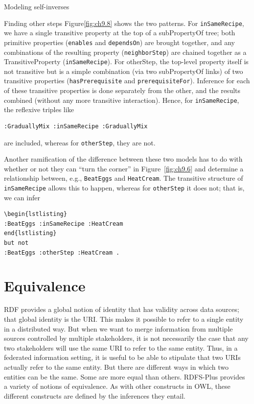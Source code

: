 \begin{challenge}{Modeling self-inverses}
\begin{challenge}{Finding other steps}
Figure\ref{fig:ch9.8} shows the two patterns. For \texttt{inSameRecipe}, we have a single
transitive property at the top of a subPropertyOf tree; both primitive
properties (\texttt{enables} and \texttt{dependsOn}) are brought together, and any
combinations of the resulting property (\texttt{neighborStep}) are chained
together as a TransitiveProperty (\texttt{inSameRecipe}). For otherStep, the
top-level property itself is not transitive but is a simple combination
(via two subPropertyOf links) of two transitive properties
(\texttt{hasPrerequisite} and \texttt{prerequisiteFor}). Inference for each of these
transitive properties is done separately from the other, and the results
combined (without any more transitive interaction). Hence, for
\texttt{inSameRecipe}, the reflexive triples like

\begin{lstlisting}
:GraduallyMix :inSameRecipe :GraduallyMix
\end{lstlisting}

are included, whereas for \texttt{otherStep}, they are not.

Another ramification of the difference between these two models has to
do with whether or not they can ``turn the corner'' in Figure~\ref{fig:ch9.6} and
determine a relationship between, e.g., \texttt{BeatEggs} and \texttt{HeatCream}. The
transitive structure of \texttt{inSameRecipe} allows this to happen, whereas for
\texttt{otherStep} it does not; that is, we can infer

\begin{lstlisting}
\begin{lstlisting}
:BeatEggs :inSameRecipe :HeatCream
end{lstlisting}
but not
:BeatEggs :otherStep :HeatCream .
\end{lstlisting}
\end{challenge}

\section{Equivalence}
\label{section:Equivalence}
RDF provides a global notion of identity that has validity across data
sources; that global identity is the URI. This makes it possible to
refer to a single entity in a distributed way. But when we want to merge
information from multiple sources controlled by multiple stakeholders,
it is not necessarily the case that any two stakeholders will use the
same URI to refer to the same entity. Thus, in a federated information
setting, it is useful to be able to stipulate that two URIs actually
refer to the same entity. But there are different ways in which two
entities can be the same. Some are more equal than others. RDFS-Plus
provides a variety of notions of equivalence. As with other constructs
in OWL, these different constructs are defined by the inferences they
entail.


\end{challenge}
